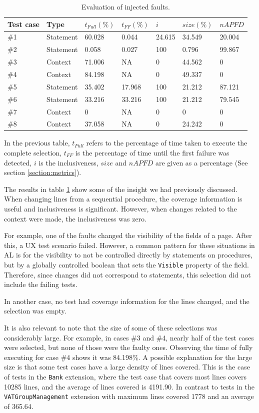 \documentclass{article}
\begin{document}
\begin{table}[H]
\centering
\begin{tabular}{||l|l|l|l|l|l|l||}
\hline
Test case& Type&$t_{Full} (\%)$ & $t_{FF} (\%)$ & $i$ & $size (\%)$ & $nAPFD$ \\ \hline\hline
\#1&Statement&60.028 & 0.044 & 24.615 & 34.549 & 20.004\\
\#2&Statement&0.058 & 0.027 & 100 & 0.796 & 99.867 \\
\#3&Context&71.006 & NA & 0 & 44.562 & 0\\
\#4&Context&84.198 & NA & 0 & 49.337 & 0 \\
\#5&Statement&35.402 & 17.968 & 100 & 21.212 & 87.121 \\
\#6&Statement&33.216 & 33.216 & 100 & 21.212 & 79.545 \\
\#7&Context&0 & NA & 0 & 0 & 0 \\
\#8&Context&37.058 & NA & 0 & 24.242 & 0 \\
\hline
\end{tabular}
\caption{Evaluation of injected faults.}
\label{table:evaluation}
\end{table}

In the previous table, $t_{Full}$ refers to the percentage of time taken to execute the complete selection, $t_{FF}$ is the percentage of time until the first failure was detected, $i$ is the inclusiveness, $size$ and $nAPFD$ are given as a percentage (See section \ref{section:metrics}).

The results in table \ref{table:evaluation} show some of the insight we had previously discussed. When changing lines from a sequential procedure, the coverage information is useful and inclusiveness is significant. However, when changes related to the context were made, the inclusiveness was zero.

For example, one of the faults changed the visibility of the fields of a page. After this, a UX test scenario failed. However, a common pattern for these situations in AL is for the visibility to not be controlled directly by statements on procedures, but by a globally controlled boolean that sets the \texttt{Visible} property of the field. Therefore, since changes did not correspond to statements, this selection did not include the failing tests.

In another case, no test had coverage information for the lines changed, and the selection was empty.

It is also relevant to note that the size of some of these selections was considerably large. For example, in cases \#3 and \#4, nearly half of the test cases were selected, but none of those were the faulty ones. Observing the time of fully executing for case \#4 shows it was 84.198\%. A possible explanation for the large size is that some test cases have a large density of lines covered. This is the case of tests in the \texttt{Bank} extension, where the test case that covers most lines covers 10285 lines, and the average of lines covered is 4191.90. In contrast to tests in the \texttt{VATGroupManagement} extension with maximum lines covered 1778 and an average of 365.64.
\end{document}
